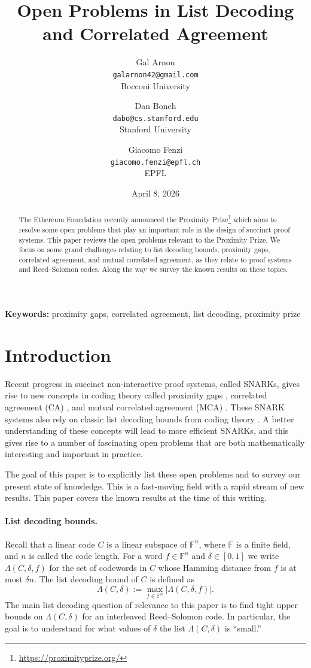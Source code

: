 \documentclass[11pt]{article}
\title{Open Problems in List Decoding and Correlated Agreement}
\author{Gal Arnon\\\texttt{galarnon42@gmail.com}\\Bocconi University
\and Dan Boneh\\\texttt{dabo@cs.stanford.edu}\\Stanford University
\and Giacomo Fenzi\\\texttt{giacomo.fenzi@epfl.ch}\\EPFL}
\date{April 8, 2026}
\theoremstyle{plain}
\theoremstyle{definition}
\newcommand{\F}{\mathbb{F}}
\newcommand{\abs}[1]{\left|#1\right|}
\begin{document}
\maketitle

\begin{abstract}
The Ethereum Foundation recently announced the Proximity Prize\footnote{\url{https://proximityprize.org/}} which aims to resolve some open problems that play an important role in the design of succinct proof systems. This paper reviews the open problems relevant to the Proximity Prize. We focus on some grand challenges relating to list decoding bounds, proximity gaps, correlated agreement, and mutual correlated agreement, as they relate to proof systems and Reed--Solomon codes. Along the way we survey the known results on these topics.
\end{abstract}

\noindent\textbf{Keywords:} proximity gaps, correlated agreement, list decoding, proximity prize

\tableofcontents
\newpage

\section{Introduction}

Recent progress in succinct non-interactive proof systems, called SNARKs, gives rise to new concepts in coding theory called proximity gaps \cite{RVW13,AHIV17}, correlated agreement (CA) \cite{BGKS20,BCIKS20}, and mutual correlated agreement (MCA) \cite{ACFY25}. These SNARK systems also rely on classic list decoding bounds from coding theory \cite{Eli57,Woz58}. A better understanding of these concepts will lead to more efficient SNARKs, and this gives rise to a number of fascinating open problems that are both mathematically interesting and important in practice.

The goal of this paper is to explicitly list these open problems and to survey our present state of knowledge. This is a fast-moving field with a rapid stream of new results. This paper covers the known results at the time of this writing.

\paragraph{List decoding bounds.}
Recall that a linear code $C$ is a linear subspace of $\F^n$, where $\F$ is a finite field, and $n$ is called the code length. For a word $f\in \F^n$ and $\delta\in[0,1]$ we write $\Lambda(C,\delta,f)$ for the set of codewords in $C$ whose Hamming distance from $f$ is at most $\delta n$. The list decoding bound of $C$ is defined as
\[
  \Lambda(C,\delta) := \max_{f\in\F^n} \abs{\Lambda(C,\delta,f)}.
\]
The main list decoding question of relevance to this paper is to find tight upper bounds on $\Lambda(C,\delta)$ for an interleaved Reed--Solomon code. In particular, the goal is to understand for what values of $\delta$ the list $\Lambda(C,\delta)$ is ``small.''
\end{document}
